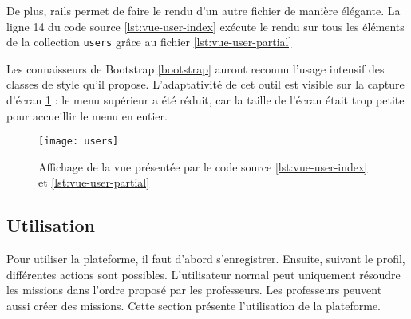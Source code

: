 \begin{figure}

\end{figure}
De plus, \gls{rails} permet de faire le rendu d'un autre fichier de manière élégante. La ligne 14 du code source \ref{lst:vue-user-index} exécute le rendu sur tous les éléments de la collection \texttt{users} grâce au fichier \ref{lst:vue-user-partial}

Les connaisseurs de Bootstrap \ref{bootstrap} auront reconnu l'usage intensif des classes de style qu'il propose. L'adaptativité de cet outil est visible sur la capture d'écran \ref{fig:vue-users} : le menu supérieur a été réduit, car la taille de l'écran était trop petite pour accueillir le menu en entier.

\begin{figure}
  \begin{center}
    \texttt{[image: users]}
    \caption{Affichage de la vue présentée par le code source \ref{lst:vue-user-index} et \ref{lst:vue-user-partial}}
    \label{fig:vue-users}
  \end{center}
\end{figure}

\subsection{Utilisation}
Pour utiliser la plateforme, il faut d'abord s'enregistrer. Ensuite, suivant le profil, différentes actions sont possibles. L'utilisateur normal peut uniquement résoudre les missions dans l'ordre proposé par les professeurs. Les professeurs peuvent aussi créer des missions. Cette section présente l'utilisation de la plateforme.

